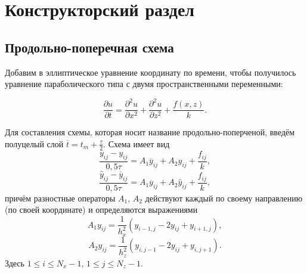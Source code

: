 \chapter{Конструкторский раздел}

\section{Продольно-поперечная схема}

%
%
%

Добавим в эллиптическое уравнение координату по времени, чтобы получилось уравнение параболического типа с двумя пространственными переменными:

\begin{equation}
	\frac{\partial u}{\partial t} = \frac{\partial^2 u}{\partial x^2} + \frac{\partial^2 u}{\partial z^2} + \frac{f(x, z)}{k}.
\end{equation}

Для составления схемы, которая носит название продольно-поперченой, введём полуцелый слой $\overline{t} = t_m + \frac\tau2$.
Схема имеет вид
\begin{equation}
	\label{eqn:schema1}
	\frac{\overline y_{ij} - y_{ij}}{0,5\tau} = A_1\overline y_{ij} + A_2y_{ij} + \frac{f_{ij}}k,
\end{equation}
\begin{equation}
	\label{eqn:schema2}
	\frac{\hat y_{ij} - \overline y_{ij}}{0,5\tau} = A_1\overline y_{ij} + A_2\hat y_{ij} + \frac{f_{ij}}k,
\end{equation}
причём разностные операторы $A_1$, $A_2$ действуют каждый по своему направлению (по своей координате) и определяются выражениями
\begin{equation}
	A_1 y_{ij} = \frac{1}{h_x^2} (y_{i - 1, j} - 2y_{ij} + y_{i + 1, j}),
\end{equation}
\begin{equation}
	A_2 y_{ij} = \frac{1}{h_z^2} (y_{i, j - 1} - 2y_{ij} + y_{i, j + 1}).
\end{equation}
Здесь $1 \leqslant i \leqslant N_x - 1$, $1 \leqslant j \leqslant N_z - 1$.

